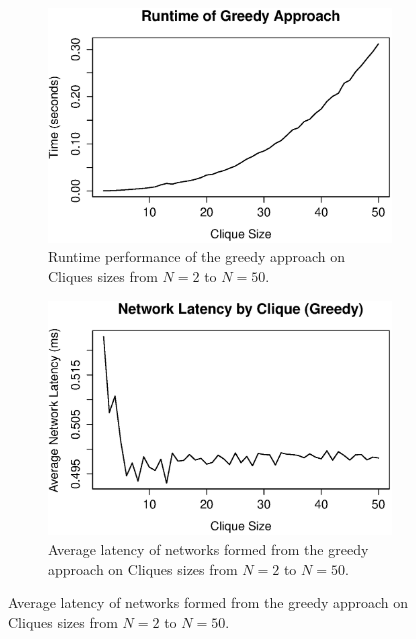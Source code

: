 \begin{figure}[ht]
\begin{subfigure}{0.48\textwidth}
\includegraphics[width=\linewidth]{figures/greedy-runtime}
\caption{Runtime performance of the greedy approach on Cliques sizes from $N=2$ to $N=50$.}
\label{fig:greedy-runtime}
\end{subfigure}\hspace*{\fill}
\begin{subfigure}{0.48\textwidth}
\includegraphics[width=\linewidth]{figures/greedy-latency}
\caption{Average latency of networks formed from the greedy approach on Cliques sizes from $N=2$ to $N=50$.}
\label{fig:greedy-latency}
\end{subfigure}
\end{figure}


